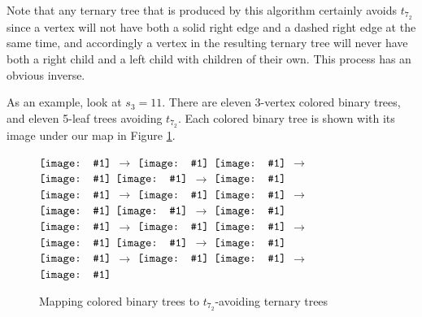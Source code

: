 \documentclass[12pt]{article}
\newcommand{\vcentergraphics}[1]{\ensuremath{\vcenter{\hbox{\texttt{[image: \#1]}}}}}
\begin{document}
Note that any ternary tree that is produced by this algorithm certainly avoids $t_{7_2}$ since a vertex will not have both a solid right edge and a dashed right edge at the same time, and accordingly a vertex in the resulting ternary tree will never have both a right child and a left child with children of their own.  This process has an obvious inverse.

As an example, look at $s_3=11$.  There are eleven 3-vertex colored binary trees, and eleven 5-leaf trees avoiding $t_{7_2}$.  Each colored binary tree is shown with its image under our map in Figure \ref{F:sch}.

\begin{figure}[bht]
\begin{center}

\vcentergraphics{ternary_tree_7-3-binary} $\rightarrow$ \vcentergraphics{ternary_tree_7-3} \hspace{.4in}
\vcentergraphics{ternary_tree_7-3-reflected-binary} $\rightarrow$ \vcentergraphics{ternary_tree_7-3-reflected} \hspace{.4in}
\vcentergraphics{ternary_tree_7-6-binary} $\rightarrow$ \vcentergraphics{ternary_tree_7-6} \\ \vspace{3mm}
\vcentergraphics{ternary_tree_7-4-binary} $\rightarrow$ \vcentergraphics{ternary_tree_7-4} \hspace{.4in}
\vcentergraphics{ternary_tree_7-4-reflected-binary} $\rightarrow$ \vcentergraphics{ternary_tree_7-4-reflected} \hspace{.4in}
\vcentergraphics{ternary_tree_7-7-binary} $\rightarrow$ \vcentergraphics{ternary_tree_7-7} \\ \vspace{3mm}
\vcentergraphics{ternary_tree_7-5-binary} $\rightarrow$ \vcentergraphics{ternary_tree_7-5} \hspace{.4in}
\vcentergraphics{ternary_tree_7-5-reflected-binary} $\rightarrow$ \vcentergraphics{ternary_tree_7-5-reflected} \hspace{.4in}
\vcentergraphics{ternary_tree_7-6-reflected-binary} $\rightarrow$ \vcentergraphics{ternary_tree_7-6-reflected} \\ \vspace{3mm}
\vcentergraphics{ternary_tree_7-1-binary} $\rightarrow$ \vcentergraphics{ternary_tree_7-1} \hspace{.4in}
\vcentergraphics{ternary_tree_7-1-reflected-binary} $\rightarrow$ \vcentergraphics{ternary_tree_7-1-reflected} 
\end{center}
\caption{Mapping colored binary trees to $t_{7_2}$-avoiding ternary trees}
\label{F:sch}
\end{figure}
\end{document}
